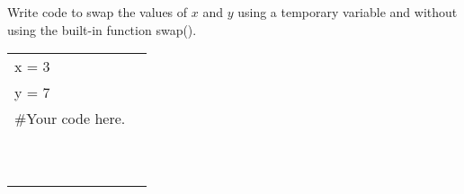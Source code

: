




	\item 
		Write code to swap the values of $x$ and $y$ using a temporary variable and without using
		the built-in function swap().\\		
		\begin{tabular}{|ll}
			\\			
			x = 3\\
			y = 7\\[5pt]
			\#Your code here. \\[5pt]
			& \\ & \\ & \\ & \\ & \\ & \\ & \\ & \\ & \\ & \\ 
		\end{tabular}



